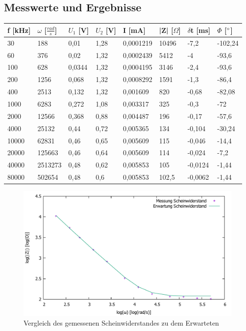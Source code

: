 \documentclass{scrartcl}
\begin{document}
\subsection{Messwerte und Ergebnisse}
\begin{table}[H]
\begin{center}
\begin{tabular}{l|l|l|l|l|l|l|l}
f [kHz] & $\omega$ [$\frac{rad}{s}$] & $U_1$ [V] & $U_2$ [V] & I [mA] & |Z| [$\Omega$] & $\delta$t [ms] & $\Phi$ [$\degree$]\\ 
\hline
30	&188	&0,01	&1,28&	0,0001219	&10496	&-7,2	&-102,24\\
60	&376	&0,02	&1,32&	0,0002439	&5412	&-4	&-93,6\\
100	&628	&0,0344	&1,32&	0,0004195	&3146	&-2,4	&-93,6\\
200	&1256	&0,068	&1,32&	0,0008292	&1591	&-1,3	&-86,4\\
400	&2513	&0,132	&1,32&	0,001609	&820	&-0,68	&-82,08\\
1000&	6283&	0,272&	1,08&	0,003317&	325	&-0,3	&-72\\
2000&	12566&	0,368&	0,88&	0,004487&	196	&-0,17	&-57,6\\
4000&	25132&	0,44&	0,72&	0,005365&	134	&-0,104	&-30,24\\
10000&	62831&	0,46&	0,65&	0,005609&	115	&-0,046	&-14,4\\
20000&	125663&	0,46&	0,64&	0,005609&	114	&-0,024	&-7,2\\
40000&	2513273&	0,48&	0,62&	0,005853&	105	&-0,0124&	-1,44\\
80000&	502654&	0,48	&0,6	&0,005853	&102,5	&-0,0062&	-1,44\\
\end{tabular}
\end{center}
\label{tab:Phasenmessung}
\end{table}
\begin{figure}[H]
  \centering
    \includegraphics[width=\textwidth]{logo.pdf}
  \caption{Vergleich des gemessenen Scheinwiderstandes zu dem Erwarteten}
  \label{fig:Aufbau_Foto}
\end{figure}
\end{document}
